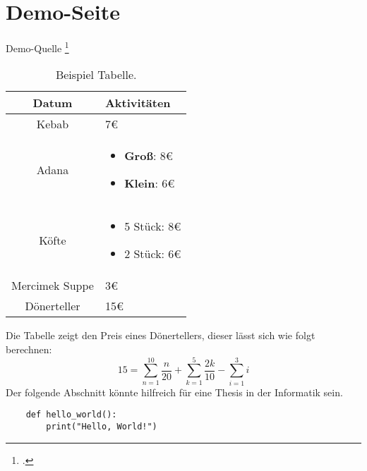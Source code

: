 \section{Demo-Seite}
Demo-Quelle \footcite[Vgl.][]{DemoQuelle}

\begin{center}
    \begin{table}[h]
    \centering
    \begin{tabular}{|c|p{6cm}|}
        \hline
        \textbf{Datum} & \textbf{Aktivitäten} \\
        \hline
        Kebab & 7€ \\
        \hline
        Adana & \begin{itemize}
            \item \textbf{Groß}: 8€
            \item \textbf{Klein}: 6€
        \end{itemize} \\
        \hline
        Köfte & \begin{itemize}
            \item 5 Stück: 8€
            \item 2 Stück: 6€
        \end{itemize}\\
        \hline
        Mercimek Suppe & 3€ \\
        \hline
        Dönerteller & 15€ \\
        \hline
    \end{tabular}
    \caption{Beispiel Tabelle.}
    \label{tab:example}
    \end{table}
    \end{center}

Die Tabelle zeigt den Preis eines Dönertellers, dieser lässt sich wie folgt berechnen:
\begin{equation}
    15 = \sum_{n=1}^{10} \frac{n}{20} + \sum_{k=1}^{5} \frac{2k}{10} - \sum_{i=1}^{3} i
\end{equation}
\newpage
Der folgende Abschnitt könnte hilfreich für eine Thesis in der Informatik sein.
\begin{lstlisting}
    def hello_world():
        print("Hello, World!")
\end{lstlisting}